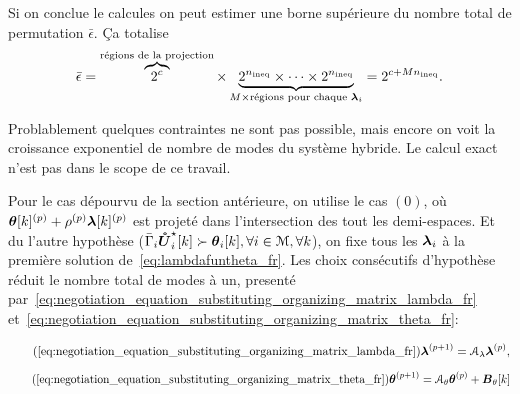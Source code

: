 \documentclass[../main.tex]{subfiles}
\begin{document}
Si on conclue le calcules on peut estimer une borne supérieure du nombre total de permutation $\bar{\epsilon}$. Ça totalise
\begin{equation}
  \label{eq:1_fr}
  \bar{\epsilon}=\overbrace{2^{c}}^{\text{régions de la projection}}\times \underbrace{2^{n_{\text{ineq}}}\times \dots \times 2^{{n_{\text{ineq}}}}}_{M\times \text{régions pour chaque }\boldsymbol{\lambda}_{i} }=2^{c+Mn_{\text{ineq}}}.
\end{equation}

\begin{remark}
  Problablement quelques contraintes ne sont pas possible, mais encore on voit la croissance exponentiel de nombre de modes du système hybride.
  Le calcul exact n'est pas dans le scope de ce travail.
\end{remark}

Pour le cas dépourvu de la section antérieure, on utilise le cas $(0)$, où $\boldsymbol{\theta}[k]^{(p)}+\rho^{(p)}\boldsymbol{\lambda}[k]^{(p)}$ est projeté dans l'intersection des tout les demi-espaces.
Et du l'autre hypothèse ($\bar{\Gamma}_{i}\optuncUik\succ \thetaik, \forall i\in\set{M}, \forall k$), on fixe tous les $\boldsymbol{\lambda}_{i}$ à la première solution de~\eqref{eq:lambdafuntheta_fr}.
Les choix consécutifs d'hypothèse réduit le nombre total de modes à un, presenté par~\eqref{eq:negotiation_equation_substituting_organizing_matrix_lambda_fr} et~\eqref{eq:negotiation_equation_substituting_organizing_matrix_theta_fr}:

\begin{equation}
  \label{eq:negotiation_equation_substituting_organizing_matrix_lambda_reprise_fr}
  \tag{\ref*{eq:negotiation_equation_substituting_organizing_matrix_lambda_fr}}
  \vec{\lambda}\pplusone=\mathcal{A}_{\lambda}\vec{\lambda}\p,
\end{equation}
\begin{equation}
  \label{eq:negotiation_equation_substituting_organizing_matrix_theta_reprise_fr}
  \tag{\ref*{eq:negotiation_equation_substituting_organizing_matrix_theta_fr}}
  \vec{\theta}\pplusone=\mathcal{A}_{\theta}\vec{\theta}\p+\mathcal{\vec{B}}_{\theta}[k]
\end{equation}
\end{document}
